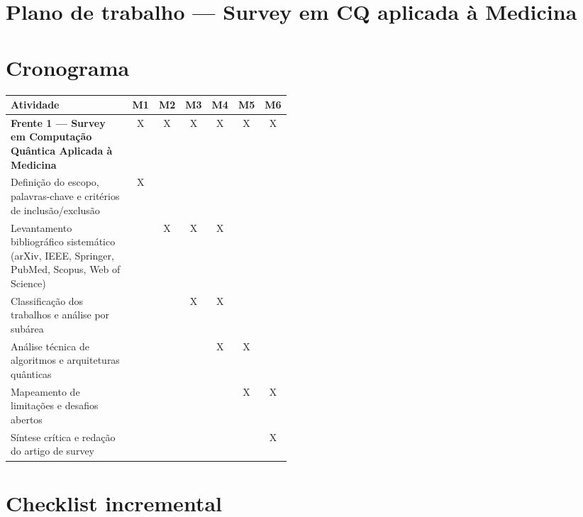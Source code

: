 \documentclass[11pt]{article}
\begin{document}
\section*{Plano de trabalho — Survey em CQ aplicada à Medicina}

\section{Cronograma}

\begin{center}
\renewcommand{\arraystretch}{1.15}
\begin{tabular}{|p{0.46\linewidth}|*{6}{c|}}
\hline
\textbf{Atividade} & \textbf{M1} & \textbf{M2} & \textbf{M3} & \textbf{M4} & \textbf{M5} & \textbf{M6} \\
\hline
\textbf{Frente 1 --- Survey em Computação Quântica Aplicada à Medicina}
& X & X & X & X & X & X \\
\hline
Definição do escopo, palavras-chave e critérios de inclusão/exclusão
& X & & & & & \\
Levantamento bibliográfico sistemático (arXiv, IEEE, Springer, PubMed, Scopus, Web of Science)
& & X & X & X & & \\
Classificação dos trabalhos e análise por subárea
& & & X & X & & \\
Análise técnica de algoritmos e arquiteturas quânticas
& & & & X & X & \\
Mapeamento de limitações e desafios abertos
& & & & & X & X \\
Síntese crítica e redação do artigo de survey
& & & & & & X \\
\hline
\end{tabular}
\end{center}

\section{Checklist incremental}

\end{document}
